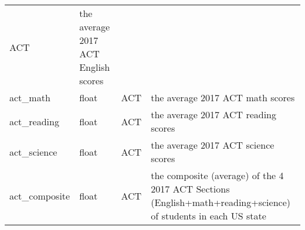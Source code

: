 \documentclass[11pt]{article}
\begin{document}
\begin{longtable}[]{@{}llll@{}}
\begin{minipage}[t]{0.05\columnwidth}
ACT\strut
\end{minipage} & \begin{minipage}[t]{0.05\columnwidth}\raggedright\strut
the average 2017 ACT English scores\strut
\end{minipage}\tabularnewline
\begin{minipage}[t]{0.05\columnwidth}\raggedright\strut
act\_math\strut
\end{minipage} & \begin{minipage}[t]{0.05\columnwidth}\raggedright\strut
float\strut
\end{minipage} & \begin{minipage}[t]{0.05\columnwidth}\raggedright\strut
ACT\strut
\end{minipage} & \begin{minipage}[t]{0.05\columnwidth}\raggedright\strut
the average 2017 ACT math scores\strut
\end{minipage}\tabularnewline
\begin{minipage}[t]{0.05\columnwidth}\raggedright\strut
act\_reading\strut
\end{minipage} & \begin{minipage}[t]{0.05\columnwidth}\raggedright\strut
float\strut
\end{minipage} & \begin{minipage}[t]{0.05\columnwidth}\raggedright\strut
ACT\strut
\end{minipage} & \begin{minipage}[t]{0.05\columnwidth}\raggedright\strut
the average 2017 ACT reading scores\strut
\end{minipage}\tabularnewline
\begin{minipage}[t]{0.05\columnwidth}\raggedright\strut
act\_science\strut
\end{minipage} & \begin{minipage}[t]{0.05\columnwidth}\raggedright\strut
float\strut
\end{minipage} & \begin{minipage}[t]{0.05\columnwidth}\raggedright\strut
ACT\strut
\end{minipage} & \begin{minipage}[t]{0.05\columnwidth}\raggedright\strut
the average 2017 ACT science scores\strut
\end{minipage}\tabularnewline
\begin{minipage}[t]{0.05\columnwidth}\raggedright\strut
act\_composite\strut
\end{minipage} & \begin{minipage}[t]{0.05\columnwidth}\raggedright\strut
float\strut
\end{minipage} & \begin{minipage}[t]{0.05\columnwidth}\raggedright\strut
ACT\strut
\end{minipage} & \begin{minipage}[t]{0.05\columnwidth}\raggedright\strut
the composite (average) of the 4 2017 ACT Sections
(English+math+reading+science) of students in each US state\strut
\end{minipage}\tabularnewline
\bottomrule
\end{longtable}
\end{document}
